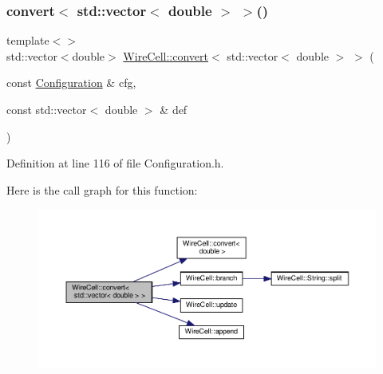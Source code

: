 \subsubsection{\texorpdfstring{convert$<$ std\+::vector$<$ double $>$ $>$()}{convert< std::vector< double > >()}}
{\footnotesize\ttfamily template$<$$>$ \\
std\+::vector$<$double$>$ \hyperlink{namespace_wire_cell_a5f6648d6ae801b20a17b8a35fd3306e5}{Wire\+Cell\+::convert}$<$ std\+::vector$<$ double $>$ $>$ (\begin{DoxyParamCaption}\item[{const \hyperlink{namespace_wire_cell_a9f705541fc1d46c608b3d32c182333ee}{Configuration} \&}]{cfg,  }\item[{const std\+::vector$<$ double $>$ \&}]{def }\end{DoxyParamCaption})\hspace{0.3cm}{\ttfamily [inline]}}



Definition at line 116 of file Configuration.\+h.

Here is the call graph for this function\+:
\nopagebreak
\begin{figure}[H]
\begin{center}
\leavevmode
\includegraphics[width=350pt]{namespace_wire_cell_abb75ebf5f2ee143cd568e7d8db4f4db4_cgraph}
\end{center}
\end{figure}
\mbox{\label{namespace_wire_cell_a26f264ab9870372316e8c325576e097b}} 
